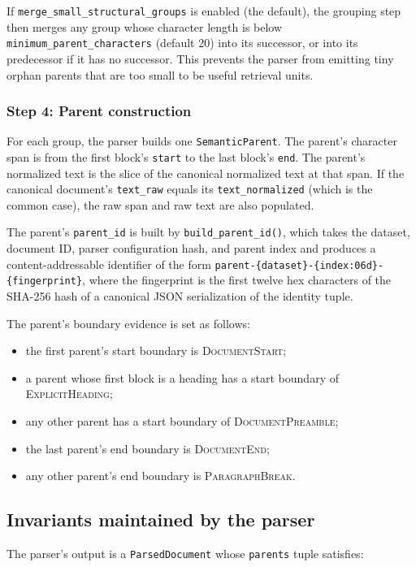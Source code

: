 \documentclass[11pt,a4paper]{article}
\begin{document}
If \texttt{merge\_small\_structural\_groups} is enabled (the default),
the grouping step then merges any group whose character length is
below \texttt{minimum\_parent\_characters} (default \num{20}) into
its successor, or into its predecessor if it has no successor. This
prevents the parser from emitting tiny orphan parents that are too
small to be useful retrieval units.

\subsubsection{Step 4: Parent construction}
For each group, the parser builds one \texttt{SemanticParent}. The
parent's character span is from the first block's \texttt{start} to
the last block's \texttt{end}. The parent's normalized text is the
slice of the canonical normalized text at that span. If the canonical
document's \texttt{text\_raw} equals its
\texttt{text\_normalized} (which is the common case), the raw span
and raw text are also populated.

The parent's \texttt{parent\_id} is built by
\texttt{build\_parent\_id()}, which takes the dataset, document ID,
parser configuration hash, and parent index and produces a
content-addressable identifier of the form
\texttt{parent-\{dataset\}-\{index:06d\}-\{fingerprint\}}, where the
fingerprint is the first twelve hex characters of the SHA-256 hash of
a canonical JSON serialization of the identity tuple.

The parent's boundary evidence is set as follows:
\begin{itemize}[leftmargin=1.5em,itemsep=0.15em]
  \item the first parent's start boundary is
    \textsc{DocumentStart};
  \item a parent whose first block is a heading has a start boundary
    of \textsc{ExplicitHeading};
  \item any other parent has a start boundary of
    \textsc{DocumentPreamble};
  \item the last parent's end boundary is \textsc{DocumentEnd};
  \item any other parent's end boundary is \textsc{ParagraphBreak}.
\end{itemize}

\subsection{Invariants maintained by the parser}
The parser's output is a \texttt{ParsedDocument} whose
\texttt{parents} tuple satisfies:
\end{document}
